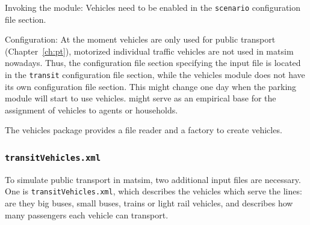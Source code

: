
\begin{compactitem}
\item Invoking the module: Vehicles need to be enabled in the \lstinline|scenario| configuration file section.
\item Configuration: At the moment vehicles are only used for public transport (Chapter~\ref{ch:pt}), \ie motorized individual traffic vehicles are not used in \gls{matsim} nowadays. Thus, the configuration file section specifying the input file is located in the \lstinline|transit| configuration file section, while the vehicles module does not have its own configuration file section. 
%
This might change one day when the parking module will start to use vehicles. \citet[][]{JaeggiEtAl_TRR_2012} might serve as an empirical base for the assignment of vehicles to agents or households.
\end{compactitem}

The vehicles package provides a file reader and a factory to create vehicles.


\subsubsection{\lstinline|transitVehicles.xml|}
\label{sec:inputdata:transitvehicles}


 

To simulate public transport in \gls{matsim}, two additional input files are necessary. One is \lstinline|transitVehicles.xml|, which describes the vehicles which serve the lines: are they big buses, small buses, trains or light rail vehicles, and describes how many passengers each vehicle can transport.

